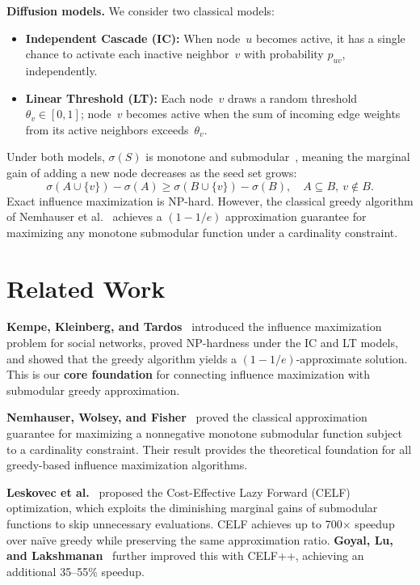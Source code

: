 \documentclass[10pt]{article}
\begin{document}
\textbf{Diffusion models.}
We consider two classical models:
\begin{itemize}
    \item \textbf{Independent Cascade (IC):} When node~$u$ becomes active, it
    has a single chance to activate each inactive neighbor~$v$ with probability
    $p_{uv}$, independently.
    \item \textbf{Linear Threshold (LT):} Each node~$v$ draws a random
    threshold $\theta_v\in[0,1]$; node~$v$ becomes active when the sum of
    incoming edge weights from its active neighbors exceeds~$\theta_v$.
\end{itemize}

Under both models, $\sigma(S)$ is monotone and submodular~\cite{kempe2003},
meaning the marginal gain of adding a new node decreases as the seed set
grows:
\[
    \sigma(A\cup\{v\})-\sigma(A)
    \geq
    \sigma(B\cup\{v\})-\sigma(B),
    \quad A\subseteq B,\ v\notin B.
\]
Exact influence maximization is NP-hard. However, the classical greedy
algorithm of Nemhauser et al.~\cite{nemhauser1978} achieves a $(1-1/e)$
approximation guarantee for maximizing any monotone submodular function under
a cardinality constraint.

\section{Related Work}

\textbf{Kempe, Kleinberg, and Tardos}~\cite{kempe2003} introduced the
influence maximization problem for social networks, proved NP-hardness under
the IC and LT models, and showed that the greedy algorithm yields a
$(1-1/e)$-approximate solution. This is our \textbf{core foundation} for
connecting influence maximization with submodular greedy approximation.

\textbf{Nemhauser, Wolsey, and Fisher}~\cite{nemhauser1978} proved the
classical approximation guarantee for maximizing a nonnegative monotone
submodular function subject to a cardinality constraint. Their result provides
the theoretical foundation for all greedy-based influence maximization
algorithms.

\textbf{Leskovec et al.}~\cite{leskovec2007} proposed the Cost-Effective Lazy
Forward (CELF) optimization, which exploits the diminishing marginal gains of
submodular functions to skip unnecessary evaluations. CELF achieves up to
700$\times$ speedup over na\"ive greedy while preserving the same
approximation ratio. \textbf{Goyal, Lu, and
Lakshmanan}~\cite{goyal2011} further improved this with CELF++, achieving an
additional 35--55\% speedup.
\end{document}
